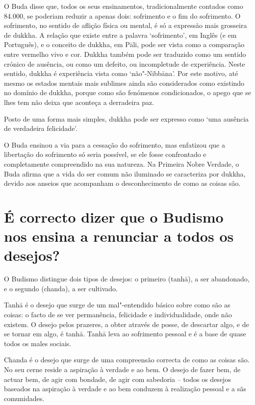 O Buda disse que, todos os seus ensinamentos, tradicionalmente contados
como 84.000, se poderiam reduzir a apenas dois: sofrimento e o fim do
sofrimento. O sofrimento, no sentido de aflição física ou mental, é só a
expressão mais grosseira de dukkha. A relação que existe entre a palavra
`sofrimento', em Inglês (e em Português), e o conceito de dukkha,
em Pāli, pode ser vista como a comparação entre vermelho vivo e cor.
Dukkha também pode ser traduzido como um sentido crónico de ausência, ou
como um defeito, ou incompletude de experiência. Neste sentido, dukkha é
experiência vista como `não"-Nibbāna'. Por este motivo, até mesmo os
estados mentais mais sublimes ainda são considerados como existindo no
domínio de dukkha, porque como são fenómenos condicionados, o apego que
se lhes tem não deixa que aconteça a derradeira paz.

Posto de uma forma mais simples, dukkha pode ser expresso como `uma
ausência de verdadeira felicidade'.

O Buda ensinou a via para a cessação do sofrimento, mas enfatizou que a
libertação do sofrimento só seria possível, se ele fosse confrontado e
completamente compreendido na sua natureza. Na Primeira Nobre Verdade, o
Buda afirma que a vida do ser comum não iluminado se caracteriza por
dukkha, devido aos anseios que acompanham o desconhecimento de como as
coisas são.

\section{É correcto dizer que o Budismo nos ensina a renunciar a todos os
  desejos?}

O Budismo distingue dois tipos de desejos: o primeiro (tanhā), a ser
abandonado, e o segundo (chanda), a ser cultivado.

Tanhā é o desejo que surge de um mal"-entendido básico sobre como são as
coisas: o facto de se ver permanência, felicidade e individualidade,
onde não existem. O desejo pelos prazeres, a obter através de posse, de
descartar algo, e de se tornar em algo, é tanhā. Tanhā leva ao
sofrimento pessoal e é a base de quase todos os males sociais.

Chanda é o desejo que surge de uma compreensão correcta de como as
coisas são. No seu cerne reside a aspiração à verdade e ao bem. O desejo
de fazer bem, de actuar bem, de agir com bondade, de agir com sabedoria
-- todos os desejos baseados na aspiração à verdade e ao bem conduzem à
realização pessoal e a sãs comunidades.

